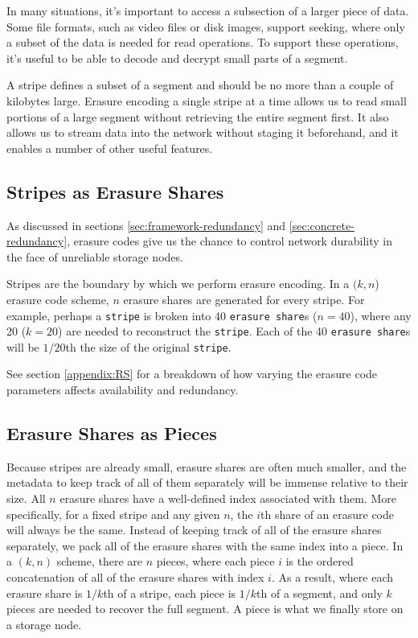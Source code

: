 \documentclass[11pt,fleqn,openany]{book}
\newcommand{\x}[1]{{\tt #1}} \newcommand{\code}[1]{{\em #1}}
\begin{document}
In many situations, it's important to access a subsection of a larger piece of
data. Some file formats, such as video files or disk images, support seeking,
where only a subset of the data is needed for read operations.
To support these operations,
it's useful to be able to decode and decrypt small parts of a segment.

A stripe defines a subset of a segment and should be no more than a
couple of kilobytes large. Erasure encoding
a single stripe at a time allows us to read small portions of a
large segment without retrieving the entire segment first.
It also allows us to stream data into the
network without staging it beforehand, and it enables a number of other useful
features.

\subsection{Stripes as Erasure Shares}

As discussed in sections \ref{sec:framework-redundancy} and
\ref{sec:concrete-redundancy}, erasure codes
give us the chance to control network durability in the face
of unreliable storage nodes.

Stripes are the boundary by which we perform erasure encoding.
In a $(k, n$) erasure code scheme, $n$ erasure shares are generated for
every stripe.
For example, perhaps a \x{stripe} is broken into 40 \x{erasure share}s
($n=40$), where any 20 ($k=20$) are needed to reconstruct the \x{stripe}. Each
of the 40 \x{erasure share}s will be $1/20$th the size of the original
\x{stripe}.

See section \ref{appendix:RS} for a breakdown of how varying the erasure code
parameters affects availability and redundancy.

\subsection{Erasure Shares as Pieces}

Because stripes are already small, erasure shares are often much
smaller, and the metadata to keep track of all of them separately will be
immense relative to their size.
All $n$ erasure shares have a well-defined index associated
with them. More specifically, for
a fixed stripe and any given $n$, the $i$th share of an erasure
code will always be the same.
Instead of keeping track of all of the
erasure shares separately, we pack all of the erasure shares with the
same index into a piece.
In a $(k, n)$ scheme, there are $n$ pieces, where each
piece $i$ is the ordered concatenation of all of the erasure shares with
index $i$. As a result, where each erasure share is $1/k$th of a
stripe, each piece is $1/k$th of a segment, and only $k$
pieces are needed to recover the full segment.
A piece is what
we finally store on a storage node.
\end{document}

